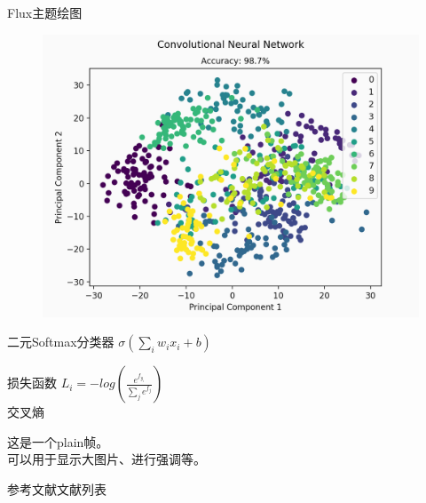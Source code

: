 \documentclass[t, aspectratio=169]{ctexbeamer}
\begin{document}
\begin{frame}{Flux主题}{绘图}
  \begin{minipage}{0.58\textwidth}
    \begin{figure}
      \includegraphics[width=\textwidth]{figs/plot.png}
    \end{figure}
  \end{minipage}
  \hfill
  \centering
  \begin{minipage}{0.4\textwidth}
    \begin{block}{二元Softmax分类器}
      \centering $\sigma(\sum_i w_ix_i + b)$
    \end{block}
    \begin{exampleblock}{损失函数}
      \centering\vspace*{0.1cm}
      $L_i = -log(\frac{e^{f_{y_i}}}{\sum_j e^{f_j}})$\\[0.1cm]
      交叉熵
    \end{exampleblock}
  \end{minipage}
\end{frame}

\begin{frame}[plain]
  \begin{center}
    这是一个plain帧。\\
    可以用于显示大图片、进行强调等。
  \end{center}
\end{frame}

\begin{frame}[allowframebreaks]{参考文献}{文献列表}
  \nocite{*}  
  \printbibliography[heading=bibliography,title=参考文献]
\end{frame}
\end{document}
